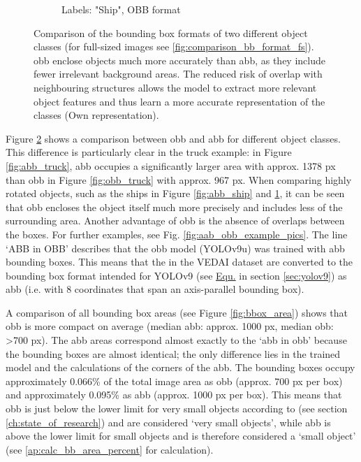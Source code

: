 \begin{figure}[h]
\begin{subfigure}[b]{0.45\textwidth}
        \caption{Labels: "Ship", OBB format}
        \label{fig:obb_ship}
    \end{subfigure}  
    \caption[Comparison of the bounding box formats of two different object classes]{Comparison of the bounding box formats of two different object classes (for full-sized images see \ref{fig:comparison_bb_format_fs}). \acrshort{obb} enclose objects much more accurately than \acrshort{abb}, as they include fewer irrelevant background areas. The reduced risk of overlap with neighbouring structures allows the model to extract more relevant object features and thus learn a more accurate representation of the classes (Own representation).
}
    \label{fig:comparison_bb_format}
\end{figure}


Figure \ref{fig:comparison_bb_format} shows a comparison between \acrshort{obb} and \acrshort{abb} for different object classes. This difference is particularly clear in the truck example: in Figure \ref{fig:abb_truck}, \acrshort{abb} occupies a significantly larger area with approx. 1378 px than \acrshort{obb} in Figure \ref{fig:obb_truck} with approx. 967 px. When comparing highly rotated objects, such as the ships in Figure \ref{fig:abb_ship} and \ref{fig:obb_ship}, it can be seen that \acrshort{obb} encloses the object itself much more precisely and includes less of the surrounding area. Another advantage of \acrshort{obb} is the absence of overlaps between the boxes. For further examples, see Fig. \ref{fig:aab_obb_example_pics}. The line ‘ABB in OBB’ describes that the \acrshort{obb} model (\acrshort{YOLO}v9u) was trained with \acrshort{abb} bounding boxes. This means that the  in the \acrshort{VEDAI} dataset are converted to the bounding box format intended for \acrshort{YOLO}v9 (see \hyperlink{eq:yolov9u} {Equ.} in section \ref{sec:yolov9}) as \acrshort{abb} (i.e. with 8 coordinates that span an axis-parallel bounding box).
 

A comparison of all bounding box areas (see Figure \ref{fig:bbox_area}) shows that \acrshort{obb} is more compact on average (median \acrshort{abb}: approx. 1000 px, median \acrshort{obb}: >700 px). The \acrshort{abb} areas correspond almost exactly to the ‘abb in obb’ because the bounding boxes are almost identical; the only difference lies in the trained model and the calculations of the corners of the \acrshort{abb}. The bounding boxes occupy approximately 0.066\% of the total image area as \acrshort{obb} (approx. 700 px per box) and approximately 0.095\% as \acrshort{abb} (approx. 1000 px per box). This means that \acrshort{obb} is just below the lower limit for very small objects according to \citeauthor {Chen2017} \cite{Chen2017} (see section \ref{ch:state_of_research}) and are considered ‘very small objects’, while \acrshort{abb} is above the lower limit for small objects and is therefore considered a ‘small object’ (see \ref{ap:calc_bb_area_percent} for calculation).




